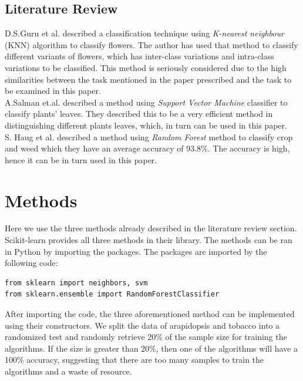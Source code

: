 \documentclass[9pt,technote]{IEEEtran}
\begin{document}
\subsection{Literature Review}
D.S.Guru et al. described a classification technique using \textit{K-nearest neighbour} (KNN) algorithm to classify flowers. \cite{guru2010texture} The author has used that method to classify different variants of flowers, which has inter-class variations and intra-class variations to be classified. This method is seriously considered due to the high similarities between the task mentioned in the paper prescribed and the task to be examined in this paper.\\

A.Salman et.al. described a method using \textit{Support Vector Machine} classifier to classify plants' leaves. They described this to be a very efficient method in distinguishing different plants leaves, which, in turn can be used in this paper.\cite{8068597}\\

S. Haug et al. described a method using \textit{Random Forest} method to classify crop and weed which they have an average accuracy of 93.8\%. The accuracy is high, hence it can be in turn used in this paper.\cite{6835733}

\section{Methods}
Here we use the three methods already described in the literature review section.\\

Scikit-learn\cite{scikitle87:online} provides all three methods in their library. The methods can be ran in Python by importing the packages. The packages are imported by the following code:\\

\begin{verbatim}
from sklearn import neighbors, svm
from sklearn.ensemble import RandomForestClassifier
\end{verbatim}

After importing the code, the three aforementioned method can be implemented using their constructors. We split the data of arapidopsis and tobacco into a randomized test and randomly retrieve 20\% of the sample size for training the algorithms. If the size is greater than 20\%, then one of the algorithms will have a 100\% accuracy, suggesting that there are too many samples to train the algorithms and a waste of resource.
\end{document}
